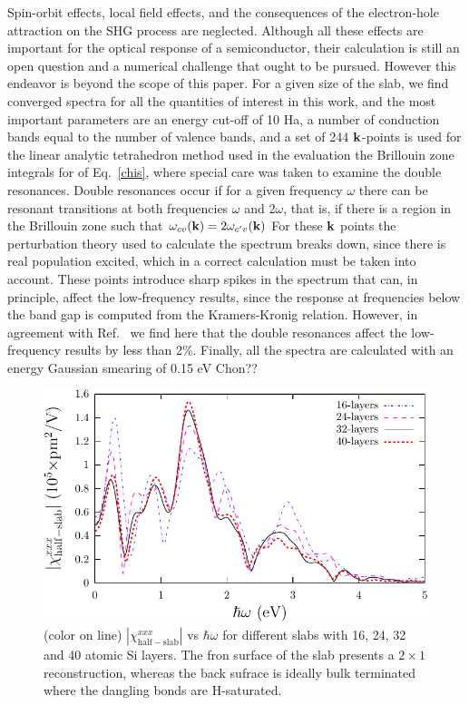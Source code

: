 \documentclass[floatfix,prb,aps,superscriptaddress,11pt,preprint,letterpaper]{revtex4}
\begin{document}
Spin-orbit effects, local field effects, and the consequences of the
electron-hole
attraction\cite{leitsmannPRB05,trollePRB14} on the SHG process are neglected. 
Although all these effects are important for the optical response of a
semiconductor, 
their calculation is still an open question and a numerical challenge
that ought to be pursued. 
However this endeavor is beyond the scope of this paper. 
For a given size  
of the slab,  we find converged spectra
for all the quantities of interest in this
work, 
and the most important parameters are
an energy cut-off of 10 Ha,
a number 
of conduction bands equal to the number of valence 
bands,
and a set of 244 $\mathbf{k}$-points
is used for
the linear analytic tetrahedron method used in the evaluation
the Brillouin zone integrals for of Eq.~\eqref{chis}, where special care
was taken to examine the double resonances.\cite{nastosPRB05}
Double resonances occur if for a given frequency $\omega$
there can be resonant
transitions at both frequencies $\omega$ and 2$\omega$,
 that is, if there is a
region in the Brillouin zone such that
$\omega_{cv}(\mathbf{k})=2 \omega_{c'v}(\mathbf{k})$
For these $\mathbf{k}$ points the perturbation theory used to calculate
the spectrum breaks down, since there is real population excited,
which in a correct calculation must be taken into account. These
points introduce sharp spikes in the spectrum that can, in
principle, affect the low-frequency results, since the response at
frequencies below the band gap is computed from the Kramers-Kronig
relation. However, in agreement with Ref.~
 we find here
that the double resonances affect the low-frequency results by less
than 2\%. 
Finally, all the spectra are calculated with an energy Gaussian smearing of  0.15 eV {\color{red}Chon??} 
\begin{figure}
\centering 
\includegraphics[scale=.8]{plots/fig1}
\caption{(color on line) 
$|\chi_{\mathrm{half-slab}}^{xxx}|$ vs $\hbar\omega$ for different slabs with 16, 24, 32 
and 40 atomic Si layers. The fron surface of the slab presents a 
$2\times 1$ reconstruction, whereas the back sufrace is ideally bulk 
terminated where the dangling bonds are H-saturated. 
\label{fig1}} 
\end{figure}
\end{document}
